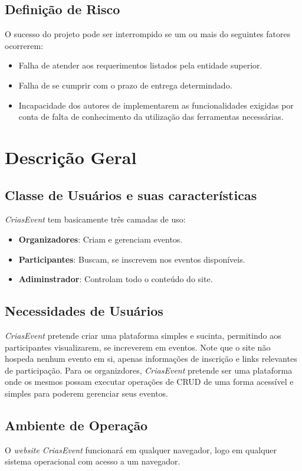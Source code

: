 \section{Definição de Risco}
    O sucesso do projeto pode ser interrompido se um ou mais do seguintes fatores ocorrerem:
    \begin{itemize}
        \item Falha de atender aos requerimentos listados pela entidade superior.
        \item Falha de se cumprir com o prazo de entrega determindado.
        \item Incapacidade dos autores de implementarem as funcionalidades exigidas por conta de falta de conhecimento da utilização das ferramentas necessárias.
    \end{itemize}


\chapter{Descrição Geral}
\label{Descrição Geral}

\section{Classe de Usuários e suas características}
\textit{CriasEvent} tem basicamente três camadas de uso:
    \begin{itemize}
        \item \textbf{Organizadores}: Criam e gerenciam eventos.
        \item \textbf{Participantes}: Buscam, se inscrevem nos eventos disponíveis.
        \item \textbf{Adiminstrador}: Controlam todo o conteúdo do site.
    \end{itemize}

\section{Necessidades de Usuários}
	\textit{CriasEvent} pretende criar uma plataforma simples e sucinta, permitindo aos participantes visualizarem, se increverem em eventos. Note que o site não hospeda nenhum evento em si, apenas informações de inscrição e links relevantes de participação. Para os organizdores, \textit{CriasEvent} pretende ser uma plataforma onde os mesmos possam executar operações de CRUD de uma forma acessível e simples para poderem gerenciar seus eventos.

\section{Ambiente de Operação}
	O \textit{website CriasEvent} funcionará em qualquer navegador, logo  em qualquer sistema operacional com acesso a um navegador.

